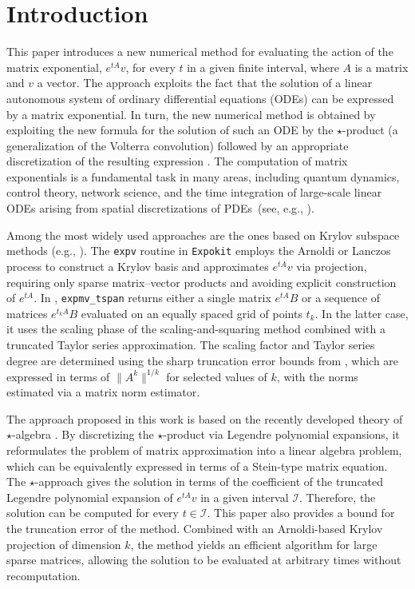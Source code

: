 \documentclass[final,1p,times,number]{elsarticle}
\theoremstyle{plain}%
\begin{document}
\section{Introduction} 
\label{sec1}
This paper introduces a new numerical method for evaluating the action of the matrix exponential, \(e^{tA}v\), for every $t$ in a given finite interval, where \(A\) is a matrix and \(v\) a vector. The approach 
exploits the fact that the solution of a linear autonomous system of ordinary differential equations (ODEs) can be expressed by a matrix exponential. In turn, the new numerical method is obtained by exploiting the new formula for the solution of such an ODE by the $\star$-product \cite{GiscardPozza,RycBouGis25} (a generalization of the Volterra convolution) followed by an appropriate discretization of the resulting expression \cite{PozzaNiel,pozza2023newk}.
The computation of matrix exponentials is a fundamental task in many areas, including quantum dynamics, control theory, network science, and the time integration of large-scale linear ODEs arising from spatial discretizations of PDEs~(see, e.g., \cite{Hochbruck2010,Ostermann2022,higham2008functions,GolMer}).  
 
 Among the most widely used approaches are the ones based on Krylov subspace methods (e.g., \cite{Moler2003}). The \texttt{expv} routine in \texttt{Expokit} \cite{Sidje} employs the Arnoldi or Lanczos process to construct a Krylov basis and approximates \(e^{tA}v\) via projection, requiring only sparse matrix–vector products and avoiding explicit construction of \(e^{tA}\). 
In \cite{al2011computing}, \texttt{expmv\_tspan} returns either a single matrix $e^{tA}B$ or a sequence of matrices $e^{t_{k}A}B$ evaluated on an equally spaced grid of points $t_k$. In the latter case, it uses the scaling phase of the scaling-and-squaring method combined with a truncated Taylor series approximation. The scaling factor and Taylor series degree are determined using the sharp truncation error bounds from \cite{al2009sharp}, which are expressed in terms of $\|A^k\|^{1/k}$ for selected values of $k$, with the norms estimated via a matrix norm estimator.

The approach proposed in this work is based on the recently developed theory of \(\star\)-algebra \cite{Pozzxa,StefanoShazma,RycBouGis25}. By discretizing the \(\star\)-product via Legendre polynomial expansions, it reformulates the problem of matrix approximation into a linear algebra problem, which can be equivalently expressed in terms of a Stein-type matrix equation. 
The \(\star\)-approach gives the solution in terms of the coefficient of the truncated Legendre polynomial expansion of \(e^{tA}v\) in a given interval \(\mathcal{I}\). Therefore, the solution can be computed for every $t \in \mathcal{I}$. This paper also provides a bound for the truncation error of the method. Combined with an Arnoldi-based Krylov projection of dimension \(k\), the method yields an efficient algorithm for large sparse matrices, allowing the solution to be evaluated at arbitrary times without recomputation.
\end{document}
